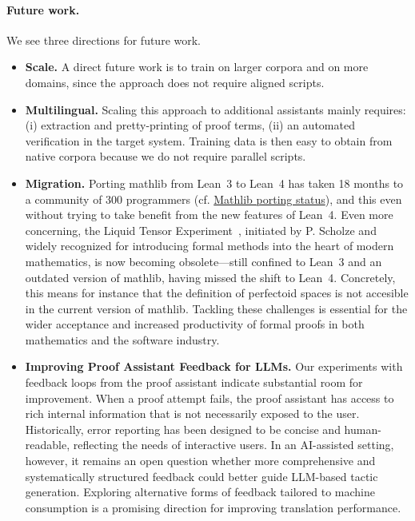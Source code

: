 \documentclass{article}
\theoremstyle{plain}
\theoremstyle{definition}
\theoremstyle{remark}
\begin{document}
	\paragraph{Future work.}
	We see three directions for future work.
	\begin{itemize}
        \item \textbf{Scale.} A direct future work is to train on
          larger corpora and on more domains, since the approach does
          not require aligned scripts. 
        \item \textbf{Multilingual.} Scaling this approach to
          additional assistants mainly requires: (i) extraction and
          pretty-printing of proof terms, (ii) an automated
          verification in the target system. Training data is then
          easy to obtain from native corpora because we do not require
          parallel scripts.
        \item \textbf{Migration.}  Porting mathlib from Lean~3 to
          Lean~4 has taken 18 months to a community of 300 programmers
          (cf.
          \href{https://leanprover-community.github.io/mathlib-port-status/}
          {Mathlib porting status}), and this even without trying to
          take benefit from the new features of Lean~4.
%
          Even more concerning, the Liquid Tensor
          Experiment~\cite{Scholze03042022}, initiated by P. Scholze
          and widely recognized for introducing formal methods into
          the heart of modern mathematics, is now becoming
          obsolete—still confined to Lean~3 and an outdated version of
          mathlib, having missed the shift to Lean~4.
%
          Concretely, this means for instance that the definition of
          perfectoid spaces is not accesible in the current version of
          mathlib.
%
          Tackling these challenges is essential for the wider
          acceptance and increased productivity of formal proofs in
          both mathematics and the software industry.
        \item \textbf{Improving Proof Assistant Feedback for LLMs.}
          Our experiments with feedback loops from the proof assistant
          indicate substantial room for improvement.
%
          When a proof attempt fails, the proof assistant has access
          to rich internal information that is not necessarily
          exposed to the user. Historically, error reporting has been
          designed to be concise and human-readable, reflecting the
          needs of interactive users.
%
          In an AI-assisted setting, however, it remains an open
          question whether more comprehensive and systematically
          structured feedback could better guide LLM-based tactic
          generation. Exploring alternative forms of feedback tailored
          to machine consumption is a promising direction for
          improving translation performance.
	\end{itemize}
	
\end{document}
